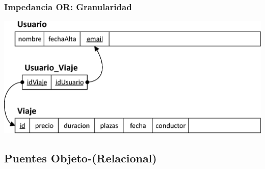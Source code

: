 \documentclass[a4paper,slidestop,xcolor=pst,blue]{beamer}
\begin{document}
\begin{frame}[c]
    \frametitle{Impedancia OR: Granularidad}
    \begin{center}
        \includegraphics[width=0.8\linewidth]{images/ooMismatch/ooMismatch08.eps}
    \end{center}
\end{frame}

\subsection{Puentes Objeto-(Relacional)}
\end{document}

